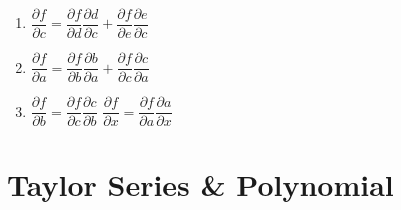 \begin{enumerate}
\begin{multicols}{3}
\begin{enumerate}[leftmargin=0.1cm, label={}]
        \item[] $
            \dfrac{\partial f}{\partial c}
            = \dfrac{\partial f}{\partial d} \dfrac{\partial d}{\partial c}
            + \dfrac{\partial f}{\partial e} \dfrac{\partial e}{\partial c}
        $
        \item[] $
            \dfrac{\partial f}{\partial a}
            = \dfrac{\partial f}{\partial b} \dfrac{\partial b}{\partial a}
            + \dfrac{\partial f}{\partial c} \dfrac{\partial c}{\partial a}
        $
        \item[] 
        $
            \dfrac{\partial f}{\partial b}
            = \dfrac{\partial f}{\partial c} \dfrac{\partial c}{\partial b}
        $
            \hspace{0.2cm}
            \vline
            \hspace{0.2cm}
        $
            \dfrac{\partial f}{\partial x}
            = \dfrac{\partial f}{\partial a} \dfrac{\partial a}{\partial x}
        $
    \end{enumerate}
    \end{multicols}
\end{enumerate}





\section{Taylor Series \& Polynomial}

